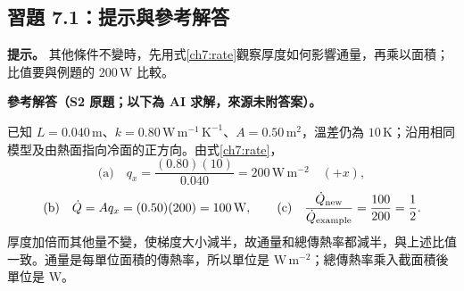 \subsection*{習題 7.1：提示與參考解答}
\textbf{提示。} 其他條件不變時，先用式\eqref{ch7:rate}觀察厚度如何影響通量，再乘以面積；比值要與例題的 $200\,\mathrm W$ 比較。

\textbf{參考解答（S2 原題；以下為 AI 求解，來源未附答案）。}\par
已知 $L=0.040\,\mathrm m$、$k=0.80\,\mathrm{W\,m^{-1}\,K^{-1}}$、$A=0.50\,\mathrm{m^2}$，溫差仍為 $10\,\mathrm K$；沿用相同模型及由熱面指向冷面的正方向。由式\eqref{ch7:rate}，
\[
\text{(a)}\quad q_x=\frac{(0.80)(10)}{0.040}=200\,\mathrm{W\,m^{-2}}\quad(+x),
\]
\[
\text{(b)}\quad \dot Q=Aq_x=(0.50)(200)=100\,\mathrm W,\qquad
\text{(c)}\quad \frac{\dot Q_{\rm new}}{\dot Q_{\rm example}}=\frac{100}{200}=\frac12.
\]
厚度加倍而其他量不變，使梯度大小減半，故通量和總傳熱率都減半，與上述比值一致。通量是每單位面積的傳熱率，所以單位是 $\mathrm{W\,m^{-2}}$；總傳熱率乘入截面積後單位是 $\mathrm W$。
